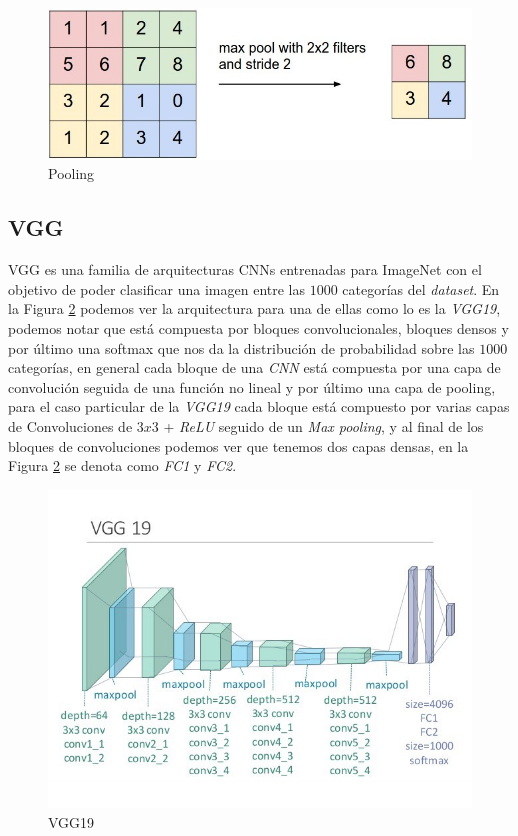\begin{figure}
\begin{center}
    \includegraphics[width=\textwidth]{images/image220.jpg}
    \caption{Pooling}
    \label{fig:pooling}
\end{center}
\end{figure}

\subsection{VGG}

VGG \cite{VGG} es una familia de arquitecturas CNNs entrenadas para ImageNet \cite{imagenet_cvpr09} con el objetivo de poder clasificar una imagen entre las $1000$ categorías del \textit{dataset}. En la Figura \ref{fig:vgg19} podemos ver la arquitectura para una de ellas como lo es la \textit{VGG19}, podemos notar que está compuesta por bloques convolucionales, bloques densos y por último una softmax que nos da la distribución de probabilidad sobre las $1000$ categorías, en general cada bloque de una \textit{CNN} está compuesta por una capa de convolución seguida de una función no lineal y por último una capa de pooling, para el caso particular de la \textit{VGG19} cada bloque está compuesto por varias capas de Convoluciones de $3x3$ + \textit{ReLU}  seguido de un \textit{Max pooling}, y al final de los bloques de convoluciones podemos ver que tenemos dos capas densas, en la Figura \ref{fig:vgg19} se denota como \textit{FC1} y \textit{FC2}.

\begin{figure}
\begin{center}
    \includegraphics[width=\textwidth]{images/image197.jpg}
    \caption{VGG19}
    \label{fig:vgg19}
\end{center}
\end{figure}

